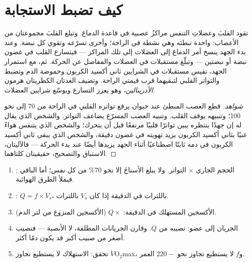 \section{كيف تضبط الاستجابة}

\begin{proposition}\label{prop:g10:heart-lungs-effort:control}
تقود القلبَ وعضلاتِ التنفس مراكزُ عصبية في قاعدة الدماغ. وتبلغ القلبَ
مجموعتان من الأعصاب: واحدة تبطئه وهي نشطة في الراحة؛ وأخرى تسرّعه
وتقوي كل نبضة. وعند بدء الجهد ينسخ أمر الدماغ إلى العضلات إلى تلك
المراكز --- فيتسارع القلب في غضون نبضة أو نبضتين --- وتبلّغ مستقبلات
في العضلات والمفاصل عن الحركة. ثم، مع استمرار الجهد، تقيس مستقبلات في
الشرايين ثاني أكسيد الكربون وحموضة الدم وتضبط  والتواتر القلبي
لتبقيهما قرب قيمتي الراحة. وتضيف الغدتان الكظريتان هرمون
\emph{الأدرينالين}، وهو يعزز التسارع ويوسّع شرايين
العضلات.
\end{proposition}
\begin{proof}[شواهد]
قطع العصب المبطئ عند حيوان يرفع تواتره القلبي في الراحة من 70 إلى نحو
100؛ وتنبيهه يوقف القلب. وتنبيه العصب المسرّع يضاعف التواتر. والشخص
الذي يقال له إن جهدًا ينتظره يبين تواترًا قلبيًا مرتفعًا قبل أن يتحرك؛
والشخص الذي يتنفس هواءً غنيًا بثاني أكسيد الكربون يزيد تهويته في غضون
دقيقة، والشخص الذي يبقى ثاني أكسيد الكربون في دمه ثابتًا اصطناعيًا
أثناء الجهد يزيدها أيضًا عند بدء الحركة --- فالآليتان، الاستباق
والتصحيح، حقيقيتان كلتاهما.
\end{proof}

\begin{method}\label{met:g10:heart-lungs-effort:compute}
\begin{enumerate}
  \item {}: الحجم الجاري $\times$ التواتر. ولا يبلغ الأسناخَ إلا
        نحو 70\% من كل نفس؛ أما الباقي فيملأ الطرق الهوائية.
  \item {}: $Q = f \times V_s$، باللترات في الدقيقة إذا
        كان $V_s$ باللترات.
  \item الأكسجين المستهلك في الدقيقة: $Q \times$ (الأكسجين المنزوع من
        لتر الدم).
  \item الجريان إلى عضو: نصيبه من $Q$. وقارن الجريانات المطلقة، لا
        الأنصبة --- فنصيب أصغر من صبيب أكبر قد يكون دمًا أكثر.
  \item تحقق: الاستهلاك لا يستطيع تجاوز $\dot V\!\mathrm{O_2}$max،
        و$f$ لا يستطيع تجاوز نحو $220 - $ العمر.
\end{enumerate}
\end{method}

